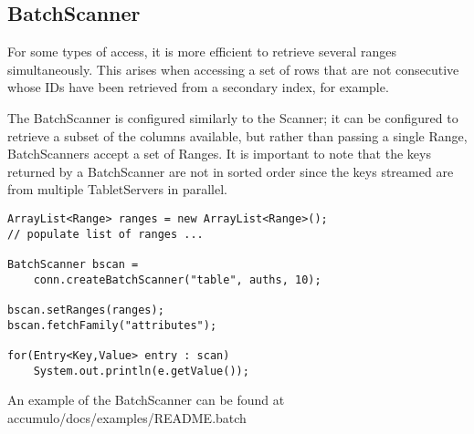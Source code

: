 \subsection{BatchScanner}

For some types of access, it is more efficient to retrieve several ranges
simultaneously. This arises when accessing a set of rows that are not consecutive
whose IDs have been retrieved from a secondary index, for example.

The BatchScanner is configured similarly to the Scanner; it can be configured to
retrieve a subset of the columns available, but rather than passing a single Range,
BatchScanners accept a set of Ranges. It is important to note that the keys returned
by a BatchScanner are not in sorted order since the keys streamed are from multiple
TabletServers in parallel.

\small
\begin{verbatim}
ArrayList<Range> ranges = new ArrayList<Range>();
// populate list of ranges ...

BatchScanner bscan =
    conn.createBatchScanner("table", auths, 10);

bscan.setRanges(ranges);
bscan.fetchFamily("attributes");

for(Entry<Key,Value> entry : scan)
    System.out.println(e.getValue());
\end{verbatim}
\normalsize

An example of the BatchScanner can be found at\\
accumulo/docs/examples/README.batch

